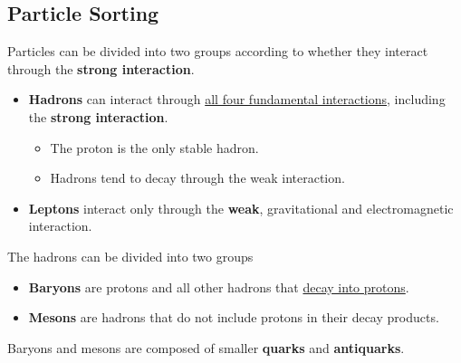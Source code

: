 \subsection{Particle Sorting}

Particles can be divided into two groups according to whether they interact through the \textbf{strong interaction}.
\begin{itemize}
    \item \textbf{Hadrons} can interact through \underline{all four fundamental interactions}, including the \textbf{strong interaction}.
        \begin{itemize}
            \item The proton is the only stable hadron.
            \item Hadrons tend to decay through the weak interaction.
        \end{itemize}
    \item \textbf{Leptons} interact only through the \textbf{weak}, gravitational and electromagnetic interaction.
\end{itemize}

The hadrons can be divided into two groups
\begin{itemize}
    \item \textbf{Baryons} are protons and all other hadrons that \underline{decay into protons}.
    \item \textbf{Mesons} are hadrons that do not include protons in their decay products.
\end{itemize}

Baryons and mesons are composed of smaller \textbf{quarks} and \textbf{antiquarks}.
